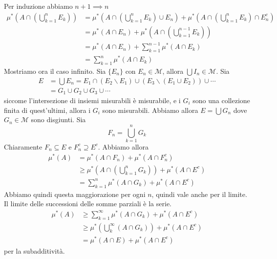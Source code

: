 \documentclass[a4paper]{article}
\begin{document}
\begin{snippetproof}{}
\begin{enumerate}
\[        \]
        Per induzione abbiamo \(n+1 \implies n\)
        \begin{align*}
            \mu^*\left(A \cap \left(\bigcup_{k=1}^n E_k\right)\right)
            &= \mu^*\left(A \cap \left(\bigcup_{k=1}^n E_k\right) \cup E_n\right)
            + \mu^*\left(
                A \cap \left(\bigcup_{k=1}^n E_k\right) \cap E_n^c
            \right) \\
            &= \mu^*(A \cap E_n) + \mu^*\left(A \cap \left(\bigcup_{k=1}^{n-1} E _k\right) \right) \\
            &= \mu^*\left(
                A \cap E_n
            \right)
            + \sum_{k=1}^{n-1} \mu^*(A \cap E_k) \\
            &= \sum_{k=1}^n \mu^*(A \cap E_k)
        \end{align*}
        Mostriamo ora il caso infinito. Sia \(\{E_n\}\) con \(E_n \in \mathcal{M}\),
        allora \(\bigcup I_n \in \mathcal{M}\). Sia
        \begin{align*}
            E &= \bigcup E_n = E_1 \cap (E_2 \backslash E_1) \cup (E_3 \backslash (E_1 \cup E_2)) \cup \cdots \\
            &= G_1 \cup G_2 \cup G_3 \cup \cdots
        \end{align*}
        siccome l'intersezione di insiemi misurabili è misurabile, e i \(G_i\) sono una collezione finita
        di quest'ultimi, allora i \(G_i\) sono misurabili.
        Abbiamo allora \(E = \bigcup G_n\) dove \(G_n \in \mathcal{M}\) sono disgiunti.
        Sia
        \[
            F_n = \bigcup_{k=1}^n G_k
        \]
        Chiaramente \(F_n \subseteq E\) e \(F_n^c \supseteq E^c\).
        Abbiamo allora
        \begin{align*}
            \mu^*(A) &= \mu^*(A \cap F_n) + \mu^*(A \cap F_n^c) \\
            &\geq \mu^*\left(A \cap \left(\bigcup_{k=1}^n G_k\right)\right)
             + \mu^*(A \cap E^c) \\
             &= \sum_{k=1}^n \mu^*\left(A \cap G_k\right)
             + \mu^*(A \cap E^c)
        \end{align*}
        Abbiamo quindi questa maggiorazione per ogni \(n\), quindi vale anche per il limite.
        Il limite delle successioni delle somme parziali è la serie.
        \begin{align*}
            \mu^*(A) &\geq \sum_{k=1}^\infty \mu^*(A \cap G_k) + \mu^*(A \cap E^c) \\
            &\geq \mu^*\left(\bigcup_k^\infty (A \cap G_k)\right)
            + \mu^*(A \cap E^c) \\
            &= \mu^*(A \cap E) + \mu^*(A \cap E^c)
        \end{align*}
        per la subadditività.
    \end{enumerate}
\end{snippetproof}
\end{document}
